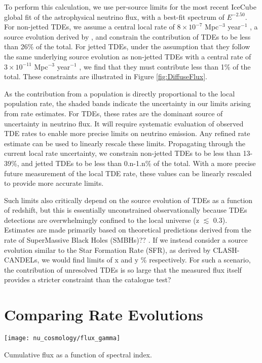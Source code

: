 To perform this calculation, we use per-source limits for the most recent IceCube global fit of the astrophysical neutrino flux, with a best-fit spectrum of $E^{-2.50}$. For non-jetted TDEs, we assume a central local rate of $8 \times 10^{-7}$ Mpc$^{-3}$ year$^{-1}$ , a source evolution derived by \cite{Sun:2015bda}, and constrain the contribution of TDEs to be less than 26\% of the total. For jetted TDEs, under the assumption that they follow the same underlying source evolution as non-jetted TDEs with a central rate of $3 \times 10^{-11}$ Mpc$^{-3}$ year$^{-1}$ , we find that they must contribute less than 1\% of the total.  These constraints are illustrated in Figure \ref{fig:DiffuseFlux}.

As the contribution from a population is directly proportional to the local population rate, the shaded bands indicate the uncertainty in our limits arising from rate estimates. For TDEs, these rates are the dominant source of uncertainty in neutrino flux. It will require systematic evaluation of observed TDE rates to enable more precise limits on neutrino emission. Any refined rate estimate can be used to linearly rescale these limits. Propagating through the current local rate uncertainty, we constrain non-jetted TDEs to be less than 13-39\%, and jetted TDEs to be less than 0.n-1.n\% of the total. With a more precise future measurement of the local TDE rate, these values can be linearly rescaled to provide more accurate limits.

Such limits also critically depend on the source evolution of TDEs as a function of redshift, but this is essentially unconstrained observationally because TDEs detections are overwhelmingly confined to the local universe (z $\lesssim$ 0.3). Estimates are made primarily based on theoretical predictions derived from the rate of SuperMassive Black Holes (SMBHs)?? \cite{Sun:2015bda}. If we instead consider a source evolution similar to the Star Formation Rate (SFR), as derived by CLASH-CANDELs, we would find limits of x and y \% respectively. For such a scenario, the contribution of unresolved TDEs is so large that the measured flux itself provides a stricter constraint than the catalogue test?

\section{Comparing Rate Evolutions}

\begin{marginfigure}
	\centering \texttt{[image: nu\_cosmology/flux\_gamma]}
	\caption{Cumulative flux as a function of spectral index.}
	\label{fig:CDF_gamma}
\end{marginfigure}


